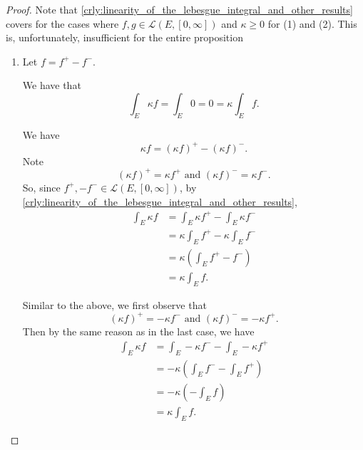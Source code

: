 \documentclass[notoc,notitlepage]{tufte-book}
\begin{document}
\begin{proof}
  Note that \cref{crly:linearity_of_the_lebesgue_integral_and_other_results}
  covers for the cases where $f, g \in \mathcal{L}(E, [0, \infty])$ and $\kappa
  \geq 0$ for (1) and (2). This is, unfortunately, insufficient for the entire
  proposition
  \begin{enumerate}
    \item Let $f = f^+ - f^-$.

      \noindent
       We have that
      \begin{equation*}
        \int_{E} \kappa f = \int_{E} 0 = 0 = \kappa \int_{E} f.
      \end{equation*}

      \noindent
       We have
      \begin{equation*}
        \kappa f = (\kappa f)^+ - (\kappa f)^-.
      \end{equation*}
      Note
      \begin{equation*}
        (\kappa f)^+ = \kappa f^+ \text{ and } (\kappa f)^- = \kappa f^-.
      \end{equation*}
      So, since $f^+, -f^- \in \mathcal{L}(E, [0, \infty])$, by
      \cref{crly:linearity_of_the_lebesgue_integral_and_other_results},
      \begin{align*}
        \int_{E} \kappa f
        &= \int_{E} \kappa f^+ - \int_{E} \kappa f^- \\
        &= \kappa \int_{E} f^+ - \kappa \int_{E} f^- \\
        &= \kappa \left( \int_{E} f^+ - f^- \right) \\
        &= \kappa \int_{E} f.
      \end{align*}

      \noindent
       Similar to the above, we first observe
      that
      \begin{equation*}
        (\kappa f)^+ = -\kappa f^- \text{ and } (\kappa f)^- = -\kappa f^+.
      \end{equation*}
      Then by the same reason as in the last case, we have
      \begin{align*}
        \int_{E} \kappa f
        &= \int_{E} -\kappa f^- - \int_{E} -\kappa f^+ \\
        &= - \kappa \left( \int_{E} f^- - \int_{E} f^+ \right) \\
        &= - \kappa \left( - \int_{E} f \right) \\
        &= \kappa \int_{E} f.
      \end{align*}


\end{enumerate}
\end{proof}
\end{document}
